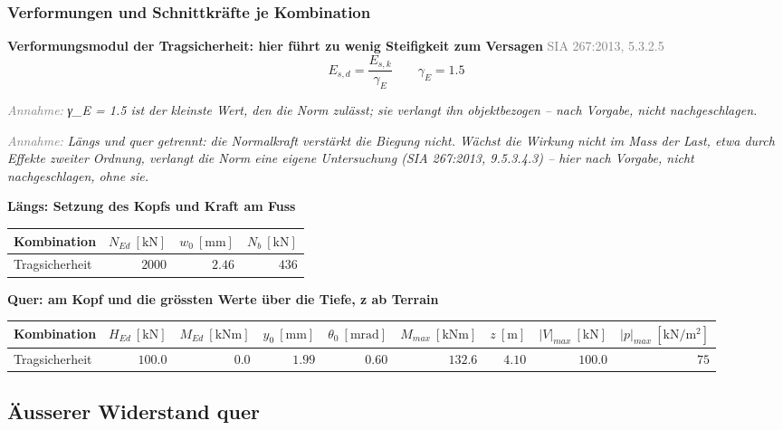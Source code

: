 \documentclass[11pt,a4paper]{article}
\newcommand{\normref}[1]{{\small\textcolor{gray}{#1}}}
\newcommand{\hinweis}[2]{\par\noindent\textcolor{gray}{\textit{#1:}} \textit{#2}\par}
\begin{document}
\subsubsection{Verformungen und Schnittkräfte je Kombination}
\noindent\textbf{Verformungsmodul der Tragsicherheit: hier führt zu wenig Steifigkeit zum Versagen} \hfill \normref{SIA 267:2013, 5.3.2.5}
\begin{equation*}
E_{s,d} = \frac{E_{s,k}}{\gamma_E} \qquad \gamma_E = 1.5
\end{equation*}
\hinweis{Annahme}{γ\_E = 1.5 ist der kleinste Wert, den die Norm zulässt; sie verlangt ihn objektbezogen – nach Vorgabe, nicht nachgeschlagen.}
\hinweis{Annahme}{Längs und quer getrennt: die Normalkraft verstärkt die Biegung nicht. Wächst die Wirkung nicht im Mass der Last, etwa durch Effekte zweiter Ordnung, verlangt die Norm eine eigene Untersuchung (SIA 267:2013, 9.5.3.4.3) – hier nach Vorgabe, nicht nachgeschlagen, ohne sie.}
\noindent\textbf{Längs: Setzung des Kopfs und Kraft am Fuss}
\begin{longtable}{lrrr}
\hline
Kombination & $N_{Ed}\ [\mathrm{kN}]$ & $w_0\ [\mathrm{mm}]$ & $N_b\ [\mathrm{kN}]$ \\
\hline
\endhead
Tragsicherheit & $2000$ & $2.46$ & $436$ \\
\hline
\end{longtable}
\noindent\textbf{Quer: am Kopf und die grössten Werte über die Tiefe, z ab Terrain}
\begin{longtable}{lrrrrrrrr}
\hline
Kombination & $H_{Ed}\ [\mathrm{kN}]$ & $M_{Ed}\ [\mathrm{kNm}]$ & $y_0\ [\mathrm{mm}]$ & $\theta_0\ [\mathrm{mrad}]$ & $M_{max}\ [\mathrm{kNm}]$ & $z\ [\mathrm{m}]$ & $|V|_{max}\ [\mathrm{kN}]$ & $|p|_{max}\ [\mathrm{kN/m^2}]$ \\
\hline
\endhead
Tragsicherheit & $100.0$ & $0.0$ & $1.99$ & $0.60$ & $132.6$ & $4.10$ & $100.0$ & $75$ \\
\hline
\end{longtable}
\subsection{Äusserer Widerstand quer}
\end{document}
